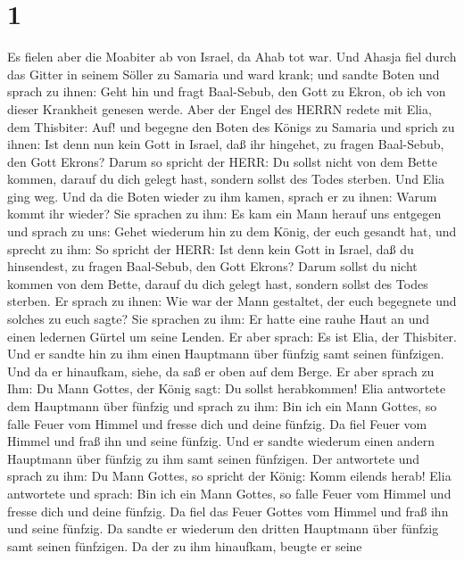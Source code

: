 \hypertarget{section}{%
\section{1}\label{section}}

 Es fielen aber die Moabiter ab von Israel, da Ahab tot war.
 Und Ahasja fiel durch das Gitter in seinem Söller zu
Samaria und ward krank; und sandte Boten und sprach zu ihnen: Geht hin
und fragt Baal-Sebub, den Gott zu Ekron, ob ich von dieser Krankheit
genesen werde.  Aber der Engel des HERRN redete mit Elia,
dem Thisbiter: Auf! und begegne den Boten des Königs zu Samaria und
sprich zu ihnen: Ist denn nun kein Gott in Israel, daß ihr hingehet, zu
fragen Baal-Sebub, den Gott Ekrons?  Darum so spricht der
HERR: Du sollst nicht von dem Bette kommen, darauf du dich gelegt hast,
sondern sollst des Todes sterben. Und Elia ging weg.  Und da
die Boten wieder zu ihm kamen, sprach er zu ihnen: Warum kommt ihr
wieder?  Sie sprachen zu ihm: Es kam ein Mann herauf uns
entgegen und sprach zu uns: Gehet wiederum hin zu dem König, der euch
gesandt hat, und sprecht zu ihm: So spricht der HERR: Ist denn kein Gott
in Israel, daß du hinsendest, zu fragen Baal-Sebub, den Gott Ekrons?
Darum sollst du nicht kommen von dem Bette, darauf du dich gelegt hast,
sondern sollst des Todes sterben.  Er sprach zu ihnen: Wie
war der Mann gestaltet, der euch begegnete und solches zu euch sagte?
 Sie sprachen zu ihm: Er hatte eine rauhe Haut an und einen
ledernen Gürtel um seine Lenden. Er aber sprach: Es ist Elia, der
Thisbiter.  Und er sandte hin zu ihm einen Hauptmann über
fünfzig samt seinen fünfzigen. Und da er hinaufkam, siehe, da saß er
oben auf dem Berge. Er aber sprach zu Ihm: Du Mann Gottes, der König
sagt: Du sollst herabkommen!  Elia antwortete dem Hauptmann
über fünfzig und sprach zu ihm: Bin ich ein Mann Gottes, so falle Feuer
vom Himmel und fresse dich und deine fünfzig. Da fiel Feuer vom Himmel
und fraß ihn und seine fünfzig.  Und er sandte wiederum
einen andern Hauptmann über fünfzig zu ihm samt seinen fünfzigen. Der
antwortete und sprach zu ihm: Du Mann Gottes, so spricht der König: Komm
eilends herab!  Elia antwortete und sprach: Bin ich ein
Mann Gottes, so falle Feuer vom Himmel und fresse dich und deine
fünfzig. Da fiel das Feuer Gottes vom Himmel und fraß ihn und seine
fünfzig.  Da sandte er wiederum den dritten Hauptmann über
fünfzig samt seinen fünfzigen. Da der zu ihm hinaufkam, beugte er seine
